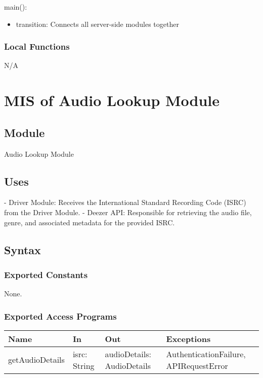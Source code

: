 \documentclass[12pt, titlepage]{article}
\begin{document}
\noindent main():
\begin{itemize}
\item transition: Connects all server-side modules together 
\end{itemize}

\subsubsection{Local Functions}
N/A  

\section{MIS of Audio Lookup Module} \label{Module:AudioLookupModule}

\subsection{Module}
Audio Lookup Module

\subsection{Uses}
- Driver Module: Receives the International Standard Recording Code (ISRC) from the Driver Module.
- Deezer API: Responsible for retrieving the audio file, genre, and associated metadata for the provided ISRC.

\subsection{Syntax}

\subsubsection{Exported Constants}
None.

\subsubsection{Exported Access Programs}

\begin{center}
\begin{tabular}{p{2cm} p{4cm} p{4cm} p{2cm}}
\hline
\textbf{Name} & \textbf{In} & \textbf{Out} & \textbf{Exceptions} \\
\hline
getAudioDetails & isrc: String & audioDetails: AudioDetails & AuthenticationFailure, APIRequestError \\
\hline
\end{tabular}
\end{center}
\end{document}
